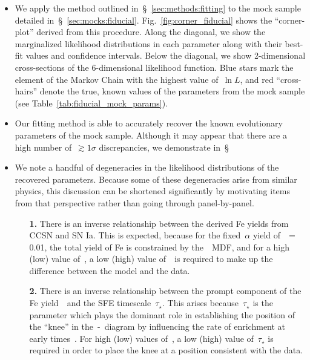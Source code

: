 \documentclass[ms.tex]{subfiles}
\begin{document}
\begin{itemize}

	\item We apply the method outlined in~\S~\ref{sec:methods:fitting} to the
	mock sample detailed in~\S~\ref{sec:mocks:fiducial}.
	Fig.~\ref{fig:corner_fiducial} shows the ``corner-plot'' derived from this
	procedure.
	Along the diagonal, we show the marginalized likelihood distributions in
	each parameter along with their best-fit values and confidence intervals.
	Below the diagonal, we show 2-dimensional cross-sections of the
	6-dimensional likelihood function.
	Blue stars mark the element of the Markov Chain with the highest value
	of~$\ln L$, and red ``cross-hairs'' denote the true, known values of the
	parameters from the mock sample (see Table~\ref{tab:fiducial_mock_params}).

	\item Our fitting method is able to accurately recover the known
	evolutionary parameters of the mock sample.
	Although it may appear that there are a high number of~$\gtrsim1\sigma$
	discrepancies, we demonstrate in~\S~

	\item We note a handful of degeneracies in the likelihood distributions of
	the recovered parameters.
	{\color{red}
	Because some of these degeneracies arise from similar physics, this
	discussion can be shortened significantly by motivating items from that
	perspective rather than going through panel-by-panel.
	}

	\begin{itemize}

		\item[\textbf{1.}] There is an inverse relationship between the
		derived Fe yields from CCSN and SN Ia.
		This is expected, because for the fixed~$\alpha$ yield of~\yacc~= 0.01,
		the total yield of Fe is constrained by the~\feh~MDF, and for a high
		(low) value of~\yfecc, a low (high) value of~\yfeia~is required to
		make up the difference between the model and the data.

		\item[\textbf{2.}] There is an inverse relationship between the prompt
		component of the Fe yield~\yfecc~and the SFE timescale~$\tau_\star$.
		This arises because~$\tau_\star$ is the parameter which plays the
		dominant role in establishing the position of the ``knee'' in
		the~\afe-\feh~diagram by influencing the rate of enrichment at early
		times~\citep[see discussion in][]{Weinberg2017}.
		For high (low) values of~\yfecc, a low (high) value of~$\tau_\star$ is
		required in order to place the knee at a position consistent with the
		data.


\end{itemize}
\end{itemize}
\end{document}
